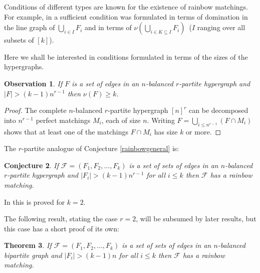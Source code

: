 \documentclass{amsart}
\newtheorem{theorem}{Theorem}[section]
\newtheorem{observation}[theorem]{Observation}
\newtheorem{conjecture}[theorem]{Conjecture}
\theoremstyle{remark}
\newcommand{\cf}{\mathcal F}
\begin{document}


Conditions of different types are known for the existence of rainbow
matchings. For example, in \cite{ah, haxell} a sufficient condition
was formulated in terms of  domination in the line graph of
$\bigcup_{i \in I}F_i$ and in terms of $\nu(\bigcup_{i \in
K\subseteq I}F_i)$~($I$ ranging over all subsets of $[k]$).




Here we shall be interested in
 conditions formulated in terms of the sizes of the hypergraphs.


\begin{observation}\label{sizecond}
If $F$  is a set of edges in an  $n$-balanced $r$-partite hypergraph
and $|F|>(k-1)n^{r-1}$ then $\nu(F) \ge k$.
\end{observation}

\begin{proof}
The complete $n$-balanced $r$-partite hypergraph $[n]^r$ can be
decomposed into $n^{r-1}$ perfect matchings $M_i$, each of size $n$.
Writing $F =\bigcup_{i \le n^{r-1}} (F \cap M_i)$ shows that at least one of
the matchings $F \cap M_i$ has size $k$ or more.
\end{proof}




The $r$-partite analogue of Conjecture \ref{rainbowgeneral} is:


\begin{conjecture}\label{sizecondition}
If $\cf=(F_1,F_2, \ldots,F_k)$ is a set of sets of edges in an
$n$-balanced $r$-partite hypergraph  and $|F_i| > (k-1)n^{r-1}$ for
all $ i \le k$ then $\cf$ has a rainbow matching.
\end{conjecture}

In \cite{ahoward} this is proved for $k=2$.

The following result, stating the case $r=2$, will be subsumed by
later results, but this case has a short proof of its own:

\begin{theorem}\label{mainbipartite}
If $\cf=(F_1,F_2, \ldots,F_k)$ is a set of sets of edges in an
$n$-balanced bipartite graph  and $|F_i| > (k-1)n$ for all $ i \le
k$ then $\cf$ has a rainbow matching.
\end{theorem}
\end{document}
